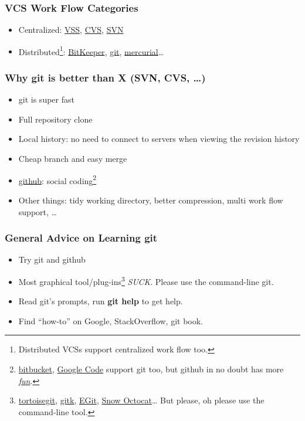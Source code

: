 \documentclass[11pt,ignorenonframetext,]{beamer}
\begin{document}
\begin{frame}\frametitle{VCS Work Flow Categories}

\begin{itemize}
\item
  Centralized:
  \href{http://msdn.microsoft.com/en-us/library/3h0544kx(v=vs.80).aspx}{VSS},
  \href{http://www.nongnu.org/cvs/}{CVS},
  \href{http://subversion.apache.org/}{SVN}
\item
  Distributed\footnote{Distributed VCSs support centralized work flow
    too.}: \href{http://www.bitkeeper.com/}{BitKeeper},
  \href{http://git-scm.com/}{git},
  \href{http://mercurial.selenic.com/}{mercurial}\ldots{}
\end{itemize}
\end{frame}

\begin{frame}\frametitle{Why git is better than X (SVN, CVS, \ldots{})}

\begin{itemize}
\item
  git is super fast
\item
  Full repository clone
\item
  Local history: no need to connect to servers when viewing the revision
  history
\item
  Cheap branch and easy merge
\item
  \href{https://github.com/}{github}: social coding\footnote{\href{https://bitbucket.org}{bitbucket},
    \href{http://code.google.com}{Google Code} support git too, but
    github in no doubt has more
    \href{http://shop.github.com/}{\emph{fun}}.}
\item
  Other things: tidy working directory, better compression, multi work
  flow support, \ldots{}
\end{itemize}
\end{frame}

\begin{frame}\frametitle{General Advice on Learning git}

\begin{itemize}
\item
  Try git and github
\item
  Most graphical tool/plug-ins\footnote{\href{http://code.google.com/p/tortoisegit/}{tortoisegit},
    \href{http://lostechies.com/joshuaflanagan/2010/09/03/use-gitk-to-understand-git/}{gitk},
    \href{http://www.eclipse.org/egit/}{EGit},
    \href{https://github.com/blog/1067-github-for-mac-1-2-snow-octocat}{Snow
    Octocat}\ldots{} But please, oh please use the command-line tool.}
  \emph{SUCK}. Please use the command-line git.
\item
  Read git's prompts, run \textbf{git help} to get help.
\item
  Find ``how-to'' on Google, StackOverflow, git book.
\end{itemize}
\end{frame}
\end{document}
